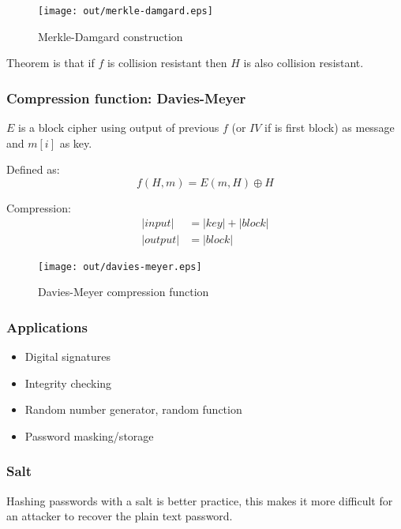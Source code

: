 \documentclass[a4paper]{article}
\begin{document}
\begin{figure}[h!]
  \centering
  \texttt{[image: out/merkle-damgard.eps]}
  \caption{Merkle-Damgard construction}
  \label{fig:merkle-damgard}
\end{figure}
\FloatBarrier

Theorem is that if $f$ is collision resistant then $H$ is also collision
resistant.

\subsubsection{Compression function: Davies-Meyer}

$E$ is a block cipher using output of previous $f$ (or $IV$ if is first block)
as message and $m[i]$ as key.

Defined as:
\[
  f(H, m) = E(m, H) \oplus H
\]

Compression:
\begin{align*}
   |input| &= |key| + |block| \\
  |output| &= |block|
\end{align*}

\begin{figure}[h!]
  \centering
  \texttt{[image: out/davies-meyer.eps]}
  \caption{Davies-Meyer compression function}
  \label{fig:davies-meyer}
\end{figure}
\FloatBarrier

\subsubsection{Applications}

\begin{itemize}
  \item Digital signatures
  \item Integrity checking
  \item Random number generator, random function
  \item Password masking/storage
\end{itemize}

\subsubsection{Salt}

Hashing passwords with a salt is better practice, this makes it more difficult
for an attacker to recover the plain text password.

\end{document}
